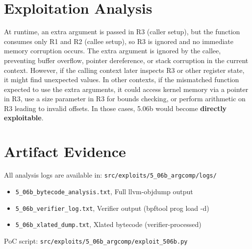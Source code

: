 \section{Exploitation Analysis}

At runtime, an extra argument is passed in R3 (caller setup), but the function consumes only R1 and R2 (callee setup), so R3 is ignored and no immediate memory corruption occurs. The extra argument is ignored by the callee, preventing buffer overflow, pointer dereference, or stack corruption in the current context. However, if the calling context later inspects R3 or other register state, it might find unexpected values. In other contexts, if the mismatched function expected to use the extra arguments, it could access kernel memory via a pointer in R3, use a size parameter in R3 for bounds checking, or perform arithmetic on R3 leading to invalid offsets. In those cases, 5.06b would become \textbf{directly exploitable}.

\section{Artifact Evidence}

All analysis logs are available in: \texttt{src/exploits/5\_06b\_argcomp/logs/}

\begin{itemize}
  \item \texttt{5\_06b\_bytecode\_analysis.txt}, Full llvm-objdump output
  \item \texttt{5\_06b\_verifier\_log.txt}, Verifier output (bpftool prog load -d)
  \item \texttt{5\_06b\_xlated\_dump.txt}, Xlated bytecode (verifier-processed)
\end{itemize}

\noindent
PoC script: \texttt{src/exploits/5\_06b\_argcomp/exploit\_506b.py}
